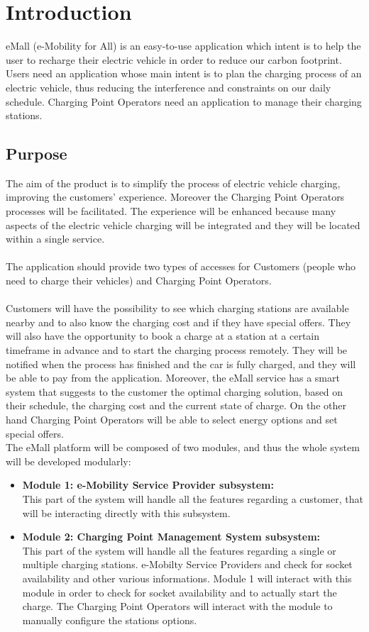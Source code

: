 \section{Introduction}
eMall (e-Mobility for All) is an easy-to-use application which intent is to help the user to recharge their electric vehicle in order to reduce our carbon footprint.
Users need an application whose main intent is to plan the charging process of an electric vehicle, thus reducing the interference and constraints on our daily schedule.
Charging Point Operators need an application to manage their charging stations. 
\subsection{Purpose}

The aim of the product is to simplify the process of electric vehicle charging, improving the customers' experience. Moreover the Charging Point Operators processes will be facilitated.
The experience will be enhanced because many aspects of the electric vehicle charging will be integrated and they will be located within a single service.
\\\\
The application should provide two types of accesses for Customers (people who need to charge their vehicles) and Charging Point Operators.
\\\\
Customers will have the possibility to see which charging stations are available nearby and to also know the charging cost and if they have special offers.
They will also have the opportunity to book a charge at a station at a certain timeframe in advance and to start the charging process remotely.
They will be notified when the process has finished and the car is fully charged, and they will be able to pay from the application.
Moreover, the eMall service has a smart system that suggests to the customer the optimal charging solution, based on their schedule, the charging cost and the current state of charge.
On the other hand Charging Point Operators will be able to select energy options and set special offers.\\
The eMall platform will be composed of two modules, and thus the whole system will be developed modularly:
\begin{itemize}
        \item \textbf{Module 1: e-Mobility Service Provider subsystem:} 
        \\This part of the system will handle all the features regarding a customer, that will be interacting directly with this subsystem.
        \item \textbf{Module 2: Charging Point Management System subsystem:} 
        \\This part of the system will handle all the features regarding a single or multiple charging stations. e-Mobilty Service Providers and  check for socket availability and other various informations. Module 1 will interact with this module in order to check for socket availability and to actually start the charge. The Charging Point Operators will interact with the module to manually configure the stations options.
\end{itemize}
